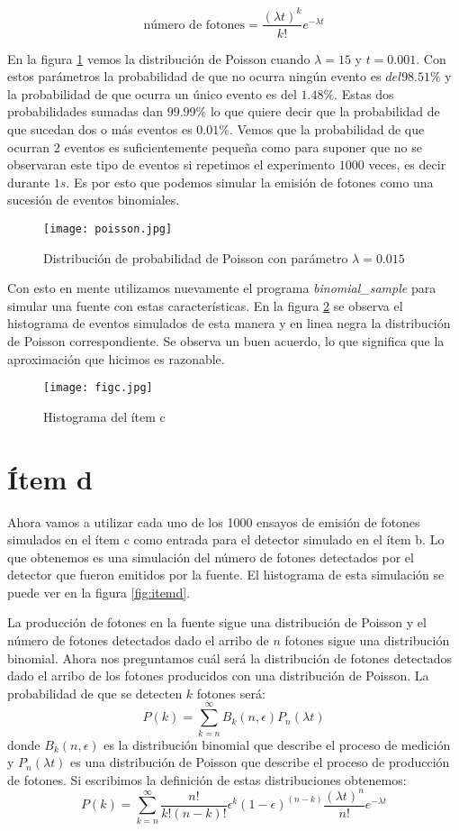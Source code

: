 \documentclass{article}
\begin{document}
$$\text{número\ de\ fotones} = \frac{(\lambda t)^k}{k!} e^{-\lambda t}$$

En la figura \ref{fig:poisson} vemos la distribución de Poisson cuando $\lambda=15$ y $t=0.001$.
Con estos parámetros la probabilidad de que no ocurra ningún evento es $del 98.51\%$ y la probabilidad de que ocurra un único evento es del $1.48\%$.
Estas dos probabilidades sumadas dan $99.99\%$  lo que quiere decir que la probabilidad de que sucedan dos o más eventos es $0.01\%$.
Vemos que la probabilidad de que ocurran 2 eventos es suficientemente pequeña como para suponer que no se observaran este tipo de eventos si repetimos el experimento $1000$ veces, es decir durante $1s$.
Es por esto que podemos simular la emisión de fotones como una sucesión de eventos binomiales.

\begin{figure}
\centering
\texttt{[image: poisson.jpg]}
\caption[]{Distribución de probabilidad de Poisson con parámetro $\lambda=0.015$}
\label{fig:poisson}
\end{figure}

Con esto en mente utilizamos nuevamente el programa \textit{binomial\_sample} para simular una fuente con estas características.
En la figura \ref{fig:itemc} se observa el histograma de eventos simulados de esta manera y en linea negra la distribución de Poisson correspondiente. Se observa un buen acuerdo, lo que significa que la aproximación que hicimos es razonable.

\begin{figure}
\centering
\texttt{[image: figc.jpg]}
\caption[]{Histograma del ítem c}
\label{fig:itemc}
\end{figure}

\section{Ítem d}
Ahora vamos a utilizar cada uno de los 1000 ensayos de emisión de fotones simulados en el ítem c como entrada para el detector simulado en el ítem b.
Lo que obtenemos es una simulación del número de fotones detectados por el detector que fueron emitidos por la fuente.
El histograma de esta simulación se puede ver en la figura  \ref{fig:itemd}.

La producción de fotones en la fuente sigue una distribución de Poisson y el número de fotones detectados dado el arribo de $n$ fotones sigue una distribución binomial.
Ahora nos preguntamos cuál será la distribución de fotones detectados dado el arribo de los fotones producidos con una distribución de Poisson.
La probabilidad de que se detecten $k$ fotones será:
$$
P(k) = \sum_{k=n}^{\infty} B_k(n, \epsilon) P_n(\lambda t)
$$
donde $B_k(n, \epsilon)$ es la distribución binomial que describe el proceso de medición y $P_n(\lambda t)$ es una distribución de Poisson que describe el proceso de producción de fotones.
Si escribimos la definición de estas distribuciones obtenemos:
$$
P(k) = \sum_{k=n}^{\infty} \frac{n!}{k!(n-k)!}\epsilon^k (1- \epsilon)^(n-k) \frac{(\lambda t)^n}{n!}e^{-\lambda t}
$$
\end{document}
